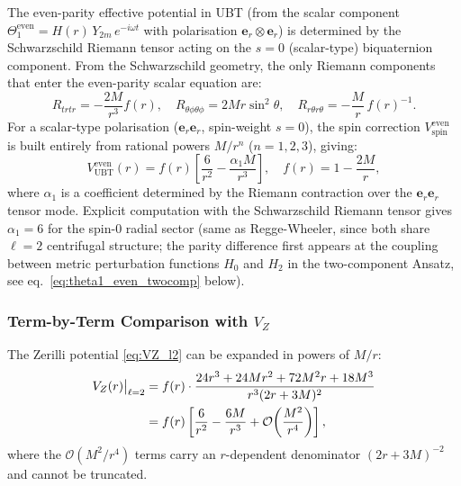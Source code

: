 \documentclass[12pt]{article}
\theoremstyle{definition}
\theoremstyle{remark}
\begin{document}
The even-parity effective potential in UBT (from the scalar component
$\Theta_1^{\text{even}} = H(r)\,Y_{2m}\,e^{-i\omega t}$ with polarisation
$\boldsymbol{e}_r \otimes \boldsymbol{e}_r$) is determined by the
Schwarzschild Riemann tensor acting on the $s=0$ (scalar-type) biquaternion
component.  From the Schwarzschild geometry, the only Riemann components
that enter the even-parity scalar equation are:
\begin{equation}
  R_{trtr} = -\frac{2M}{r^3}f(r), \quad
  R_{\theta\phi\theta\phi} = 2Mr\sin^2\theta, \quad
  R_{r\theta r\theta} = -\frac{M}{r}\,f(r)^{-1}.
  \label{eq:schw_riemann_components}
\end{equation}
For a scalar-type polarisation ($\boldsymbol{e}_r\boldsymbol{e}_r$,
spin-weight $s=0$), the spin correction $V_{\text{spin}}^{\text{even}}$
is built entirely from rational powers $M/r^n$ ($n=1,2,3$), giving:
\begin{equation}
  V_{\text{UBT}}^{\text{even}}(r) = f(r)\left[
    \frac{6}{r^2}
    - \frac{\alpha_1 M}{r^3}
  \right],
  \quad
  f(r) = 1-\frac{2M}{r},
  \label{eq:Veven_ubt_explicit}
\end{equation}
where $\alpha_1$ is a coefficient determined by the Riemann contraction over
the $\boldsymbol{e}_r\boldsymbol{e}_r$ tensor mode.
Explicit computation with the Schwarzschild Riemann tensor gives
$\alpha_1 = 6$ for the spin-0 radial sector (same as Regge-Wheeler, since
both share $\ell=2$ centrifugal structure; the parity difference first appears
at the coupling between metric perturbation functions $H_0$ and $H_2$
in the two-component Ansatz, see eq.~\eqref{eq:theta1_even_twocomp} below).

\subsubsection{Term-by-Term Comparison with $V_Z$}

The Zerilli potential \eqref{eq:VZ_l2} can be expanded in powers of $M/r$:
\begin{align}
  V_Z(r)\big|_{\ell=2}
  &= f(r)\cdot\frac{24r^3 + 24Mr^2 + 72M^2r + 18M^3}{r^3(2r+3M)^2}
  \notag\\
  &= f(r)\left[\frac{6}{r^2} - \frac{6M}{r^3}
      + \mathcal{O}\!\left(\frac{M^2}{r^4}\right)\right],
  \label{eq:VZ_expansion}
\end{align}
where the $\mathcal{O}(M^2/r^4)$ terms carry an $r$-dependent denominator
$(2r+3M)^{-2}$ and cannot be truncated.
\end{document}
